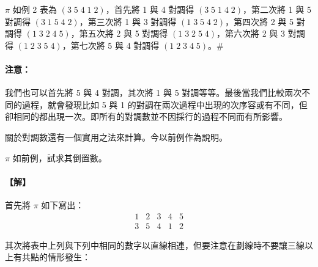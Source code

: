 \begin{example}\label{ex:b6-1-14}
$\pi$ 如例 2 表為 $(3 \; 5 \; 4 \; 1 \; 2)$，首先將 1 與 4 對調得 $(3 \; 5 \; 1 \; 4 \; 2)$，第二次將 1 與 5 對調得 $(3 \; 1 \; 5 \; 4 \; 2)$，第三次將 1 與 3 對調得 $(1 \; 3 \; 5 \; 4 \; 2)$，第四次將 2 與 5 對調得 $(1 \; 3 \; 2 \; 4 \; 5)$，第五次將 2 與 5 對調得 $(1 \; 3 \; 2 \; 5 \; 4)$，第六次將 2 與 3 對調得 $(1 \; 2 \; 3 \; 5 \; 4)$，第七次將 5 與 4 對調得 $(1 \; 2 \; 3 \; 4 \; 5)$。\hfill$\#$
\end{example}

\paragraph{注意：}我們也可以首先將 5 與 4 對調，其次將 1 與 5 對調等等。最後當我們比較兩次不同的過程，就會發現比如 5 與 1 的對調在兩次過程中出現的次序容或有不同，但卻相同的都出現一次。即所有的對調數並不因採行的過程不同而有所影響。

關於對調數還有一個實用之法來計算。今以前例作為說明。

\begin{discussion}\label{disc:b6-1-2}
$\pi$ 如前例，試求其倒置數。
\end{discussion}

\paragraph{【解】}
首先將 $\pi$ 如下寫出：
\[ \begin{matrix} 1 & 2 & 3 & 4 & 5 \\ 3 & 5 & 4 & 1 & 2 \end{matrix} \]

其次將表中上列與下列中相同的數字以直線相連，但要注意在劃線時不要讓三線以上有共點的情形發生：

\begin{figure}[H]
\centering
{}
\end{figure}


